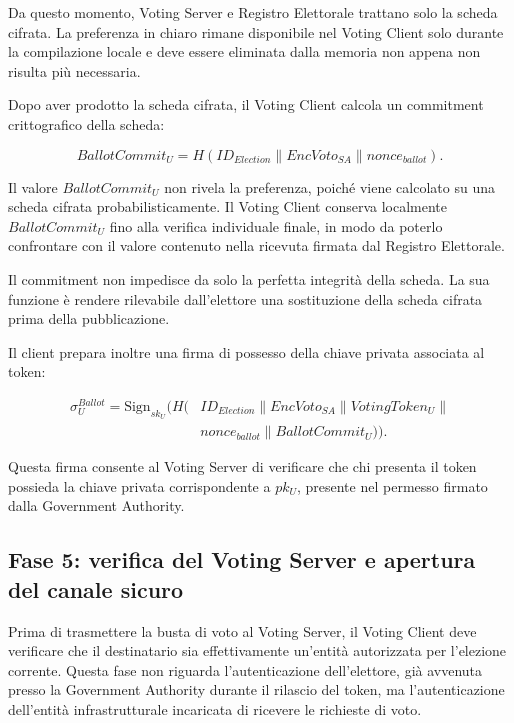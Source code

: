 \documentclass[a4paper,12pt]{article}
\begin{document}
Da questo momento, Voting Server e Registro Elettorale trattano solo la scheda cifrata. 
La preferenza in chiaro rimane disponibile nel Voting Client solo durante la compilazione locale e deve essere eliminata dalla memoria non appena non risulta pi\`u necessaria.

Dopo aver prodotto la scheda cifrata, il Voting Client calcola un commitment crittografico della scheda:

\[
	BallotCommit_U =
	H(ID_{Election} \parallel EncVoto_{SA} \parallel nonce_{ballot}).
\]

Il valore \(BallotCommit_U\) non rivela la preferenza, poich\'e viene calcolato su una scheda cifrata probabilisticamente.
Il Voting Client conserva localmente \(BallotCommit_U\) fino alla verifica individuale finale, in modo da poterlo confrontare con il valore contenuto nella ricevuta firmata dal Registro Elettorale.

Il commitment non impedisce da solo la perfetta integrità della scheda.
La sua funzione \`e rendere rilevabile dall'elettore una sostituzione della scheda cifrata prima della pubblicazione.

Il client prepara inoltre una firma di possesso della chiave privata associata al token:

\begin{equation}
\begin{split}
	\sigma_U^{Ballot} = \text{Sign}_{sk_U}\Big(H(&ID_{Election}
	\parallel EncVoto_{SA} \parallel VotingToken_U \parallel {}\\
	&nonce_{ballot} \parallel BallotCommit_U)\Big).
\end{split}
\end{equation}

Questa firma consente al Voting Server di verificare che chi presenta il token possieda la chiave privata corrispondente a \(pk_U\), presente nel permesso firmato dalla Government Authority.

\subsection{Fase 5: verifica del Voting Server e apertura del canale sicuro}

Prima di trasmettere la busta di voto al Voting Server, il Voting Client deve verificare che il destinatario sia effettivamente un'entit\`a autorizzata per l'elezione corrente.
Questa fase non riguarda l'autenticazione dell'elettore, gi\`a avvenuta presso la Government Authority durante il rilascio del token, ma l'autenticazione dell'entit\`a infrastrutturale incaricata di ricevere le richieste di voto.
\end{document}
